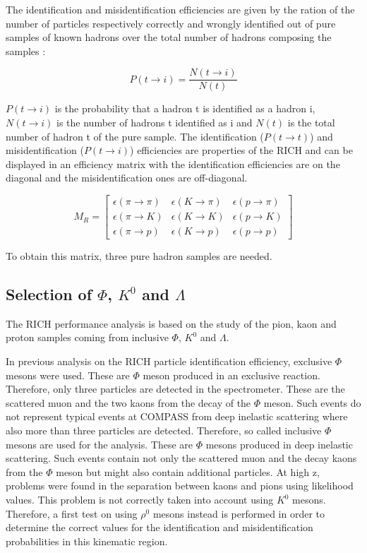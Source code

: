 The identification and misidentification efficiencies are given by the ration of the number of particles respectively correctly and wrongly identified out of pure
samples of known hadrons over the total number of hadrons composing the samples :

\begin{equation}
    P(t \rightarrow i) = \frac{N(t \rightarrow i)}{N(t)}
\end{equation}

$P(t \rightarrow i)$ is the probability that a hadron t is identified as a hadron i, $N(t \rightarrow i)$ is the number of hadrons t identified as i and $N(t)$ is the
total number of hadron t of the pure sample. The identification ($P(t \rightarrow t)$) and misidentification ($P(t \rightarrow i)$) efficiencies are properties of the RICH and can
be displayed in an efficiency matrix with the identification efficiencies are on the diagonal and the misidentification ones are off-diagonal.

\begin{equation}
  M_R
  =
  \begin{bmatrix}
  \epsilon(\pi \rightarrow \pi) & \epsilon(K \rightarrow \pi) & \epsilon(p \rightarrow \pi)\\
  \epsilon(\pi \rightarrow K) & \epsilon(K \rightarrow K) & \epsilon(p \rightarrow K) \\
  \epsilon(\pi \rightarrow p) & \epsilon(K \rightarrow p) & \epsilon(p \rightarrow p)
  \end{bmatrix}
\end{equation}

To obtain this matrix, three pure hadron samples are needed.

\subsection*{Selection of $\Phi$, $K^0$ and $\Lambda$}

The RICH performance analysis is based on the study of the pion, kaon and proton samples coming from inclusive $\Phi$, $K^0$ and $\Lambda$.

In previous analysis on the RICH particle identification efficiency, exclusive $\Phi$ mesons were used. These are $\Phi$ meson produced in an exclusive reaction.
Therefore, only three particles are detected in the spectrometer. These are the scattered muon and the two kaons from the decay of the $\Phi$ meson. Such events do not
represent typical events at COMPASS from deep inelastic scattering where also more than three particles are detected. Therefore, so called inclusive $\Phi$ mesons are
used for the analysis. These are $\Phi$ mesons produced in deep inelastic scattering. Such events contain not only the scattered muon and the decay kaons from the $\Phi$
meson but might also contain additional particles.
At high z, problems were found in the separation between kaons and pions using likelihood values\cite{}. This problem is not correctly taken into account using $K^0$ mesons.
Therefore, a first test on using $\rho^0$ mesons instead is performed in order to determine the correct values for the identification and misidentification probabilities
in this kinematic region.

